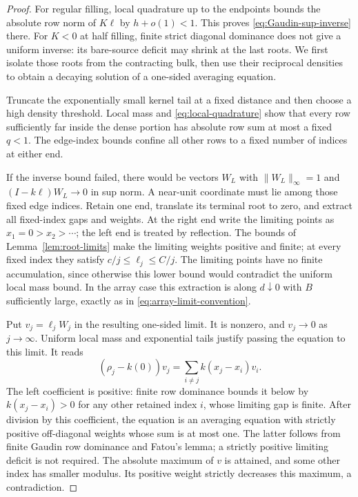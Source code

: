 \begin{proof}
For regular filling, local quadrature up to the endpoints bounds
the absolute row norm of $K\ell$ by $h+o(1)<1$.
This proves \eqref{eq:Gaudin-sup-inverse} there.
For $K<0$ at half filling, finite strict diagonal dominance does
not give a uniform inverse: its bare-source deficit may shrink at
the last roots. We first isolate those roots from the contracting bulk,
then use their reciprocal densities to obtain a decaying solution of
a one-sided averaging equation.

Truncate the exponentially small kernel tail at a fixed distance and
then choose a high density threshold.  Local mass and \eqref{eq:local-quadrature} show that
every row sufficiently far inside the dense portion has absolute
row sum at most a fixed $q<1$.  The edge-index bounds confine all
other rows to a fixed number of indices at either end.

If the inverse bound failed, there would be vectors $W_L$ with
$\|W_L\|_\infty=1$ and
$(I-k\ell)W_L\to0$ in sup norm.  A near-unit coordinate must
lie among those fixed edge indices.  Retain one end, translate its terminal root to zero, and extract
all fixed-index gaps and weights. At the right end write the limiting
points as $x_1=0>x_2>\cdots$; the left end is treated by reflection.  The bounds of
Lemma~\ref{lem:root-limits} make the limiting weights positive
and finite; at every fixed index they satisfy
$c/j\le\ell_j\le C/j$.  The limiting points have no finite
accumulation, since otherwise this lower bound would contradict
the uniform local mass bound.
In the array case this extraction is along $d\downarrow0$ with
$B$ sufficiently large, exactly as in
\eqref{eq:array-limit-convention}.

Put $v_j=\ell_jW_j$ in the resulting one-sided limit.
It is nonzero, and $v_j\to0$ as $j\to\infty$.
Uniform local mass and exponential tails justify passing the
equation to this limit.  It reads
\[
 (\rho_j-k(0))v_j=\sum_{i\ne j}k(x_j-x_i)v_i.
\]
The left coefficient is positive: finite row dominance bounds
it below by $k(x_j-x_i)>0$ for any other retained index $i$,
whose limiting gap is finite.  After division by this coefficient,
the equation is an
averaging equation with strictly positive off-diagonal weights
whose sum is at most one.  The latter follows from finite Gaudin
row dominance and Fatou's lemma; a strictly positive limiting
deficit is not required.  The absolute maximum of $v$ is attained,
and some other index has smaller modulus.  Its positive weight
strictly decreases this maximum, a contradiction.


\end{proof}
